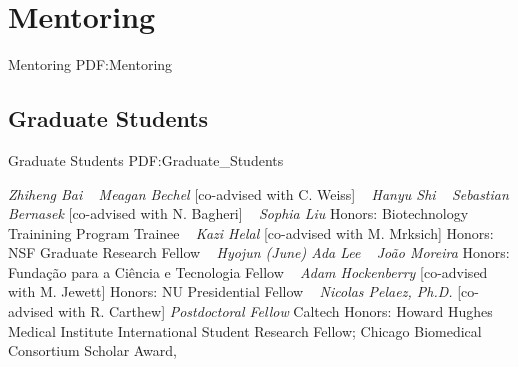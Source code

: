 \section
{Mentoring}
{Mentoring}
{PDF:Mentoring}

\subsection
{Graduate Students}
{Graduate Students}
{PDF:Graduate_Students}

\GapNoBreak
{}
\textit{Zhiheng Bai}
\newline
~
\Gap{}
\textit{Meagan Bechel}
    [co-advised with C. Weiss]
\newline
~
\Gap{}
\textit{Hanyu Shi}
\newline
~
\Gap{}
\textit{Sebastian Bernasek}
    [co-advised with N. Bagheri]
\newline
~
\Gap{}
\textit{Sophia Liu}
\newline
    {\footnotesize Honors: Biotechnology Trainining Program Trainee}
    \newline
~
\Gap{}
\textit{Kazi Helal}
    [co-advised with M. Mrksich]
\newline
    {\footnotesize Honors: NSF Graduate Research Fellow}
    \newline
~
\Gap{}
\textit{Hyojun (June) Ada Lee}
\newline
~
\Gap{}
\textit{Jo\~ao Moreira}
\newline
    {\footnotesize Honors: Funda\c{c}\~ao para a Ci\^encia e Tecnologia Fellow}
    \newline
~
\Gap{}
\textit{Adam Hockenberry}
    [co-advised with M. Jewett]
\newline
    {\footnotesize Honors: NU Presidential Fellow}
    \newline
~
\Gap{}
\textit{Nicolas Pelaez, Ph.D.}
    [co-advised with R. Carthew]
\newline
    \textit{Postdoctoral Fellow}
    \newline
    Caltech
    \newline
    {\footnotesize Honors: Howard Hughes Medical Institute International Student Research Fellow; Chicago Biomedical Consortium Scholar Award, }
